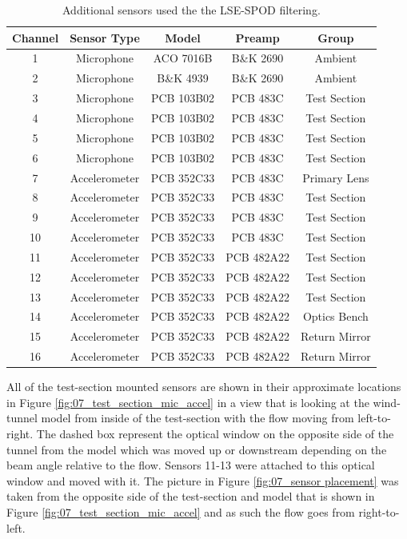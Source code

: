 \begin{table}
  \centering
  \caption{Additional sensors used the the LSE-SPOD filtering.}
  \begin{tabular}{c c c c c}
    Channel & Sensor Type & Model & Preamp & Group\\
    \hline \hline
    1 & Microphone & ACO 7016B & B\&K 2690 & Ambient \\
    2 & Microphone & B\&K 4939 & B\&K 2690 & Ambient \\
    3 & Microphone & PCB 103B02 & PCB 483C & Test Section \\
    4 & Microphone & PCB 103B02 & PCB 483C & Test Section \\
    5 & Microphone & PCB 103B02 & PCB 483C & Test Section \\
    6 & Microphone & PCB 103B02 & PCB 483C & Test Section \\
    7 & Accelerometer & PCB 352C33 & PCB 483C & Primary Lens \\
    8 & Accelerometer & PCB 352C33 & PCB 483C & Test Section \\
    9 & Accelerometer & PCB 352C33 & PCB 483C & Test Section \\
    10 & Accelerometer & PCB 352C33 & PCB 483C & Test Section \\
    11 & Accelerometer & PCB 352C33 & PCB 482A22 & Test Section \\
    12 & Accelerometer & PCB 352C33 & PCB 482A22 & Test Section \\
    13 & Accelerometer & PCB 352C33 & PCB 482A22 & Test Section \\
    14 & Accelerometer & PCB 352C33 & PCB 482A22 & Optics Bench \\
    15 & Accelerometer & PCB 352C33 & PCB 482A22 & Return Mirror \\
    16 & Accelerometer & PCB 352C33 & PCB 482A22 & Return Mirror \\
  \end{tabular}
  \label{tab:07_sensor_list}
\end{table}
All of the test-section mounted sensors are shown in their approximate locations in Figure \ref{fig:07_test_section_mic_accel} in a view that is looking at the wind-tunnel model from inside of the test-section with the flow moving from left-to-right.
The dashed box represent the optical window on the opposite side of the tunnel from the model which was moved up or downstream depending on the beam angle relative to the flow.
Sensors 11-13 were attached to this optical window and moved with it.
The picture in Figure \ref{fig:07_sensor placement} was taken from the opposite side of the test-section and model that is shown in Figure \ref{fig:07_test_section_mic_accel} and as such the flow goes from right-to-left.

